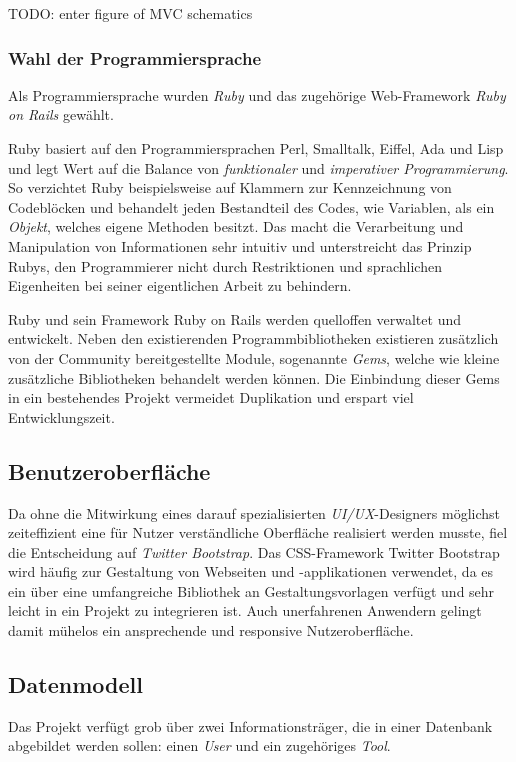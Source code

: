 TODO: enter figure of MVC schematics

\subsubsection{Wahl der Programmiersprache}
\label{sec:Wahl der Programmiersprache}
Als Programmiersprache wurden \textit{Ruby} und das zugehörige Web-Framework \textit{Ruby on Rails}
gewählt.

Ruby basiert auf den Programmiersprachen Perl, Smalltalk, Eiffel, Ada und Lisp und legt Wert auf
die Balance von \textit{funktionaler} und \textit{imperativer Programmierung}. So verzichtet Ruby beispielsweise auf
Klammern zur Kennzeichnung von Codeblöcken und behandelt jeden Bestandteil des Codes, wie Variablen,
als ein \textit{Objekt}, welches eigene Methoden besitzt. Das macht die Verarbeitung und Manipulation von
Informationen sehr intuitiv und unterstreicht das Prinzip Rubys, den Programmierer nicht durch
Restriktionen und sprachlichen Eigenheiten bei seiner eigentlichen Arbeit zu behindern.

Ruby und sein Framework Ruby on Rails werden quelloffen verwaltet und entwickelt. Neben den
existierenden Programmbibliotheken existieren zusätzlich von der Community bereitgestellte Module,
sogenannte \textit{Gems}, welche wie kleine zusätzliche Bibliotheken behandelt werden können. Die
Einbindung dieser Gems in ein bestehendes Projekt vermeidet Duplikation und erspart viel
Entwicklungszeit.

\subsection{Benutzeroberfläche}
\label{sec:Benutzeroberfläche}
Da ohne die Mitwirkung eines darauf spezialisierten \textit{UI/UX}-Designers möglichst zeiteffizient
eine für Nutzer verständliche Oberfläche realisiert werden musste, fiel die Entscheidung auf
\textit{Twitter Bootstrap}.
Das CSS-Framework Twitter Bootstrap wird häufig zur Gestaltung von Webseiten und
-applikationen verwendet, da es ein über eine umfangreiche Bibliothek an Gestaltungsvorlagen
verfügt und sehr leicht in ein Projekt zu integrieren ist. Auch unerfahrenen Anwendern gelingt damit
mühelos ein ansprechende und responsive Nutzeroberfläche.

\subsection{Datenmodell}
\label{sec:Datenmodell}
Das Projekt verfügt grob über zwei Informationsträger, die in einer Datenbank abgebildet werden
sollen: einen \textit{User} und ein zugehöriges \textit{Tool}.

